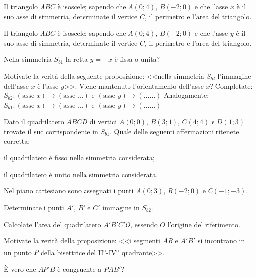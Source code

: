 \begin{esercizio}
  \label{ese:8.29} %
  Il triangolo \(ABC\) è isoscele; sapendo che \(A(0;4)\), \(B(-2;0)\) e che 
  l'asse \(x\) è il suo asse di simmetria, determinate il vertice \(C\), il 
  perimetro e l'area del triangolo.
\end{esercizio}

\begin{esercizio}
  \label{ese:8.30} %
  Il triangolo \(ABC\) è isoscele; sapendo che \(A(0;4)\), \(B(-2;0)\) e che 
  l'asse \(y\) è il suo asse di simmetria, determinate il vertice \(C\), il 
  perimetro e l'area del triangolo.
\end{esercizio}

\begin{esercizio}
  \label{ese:8.34} %
  Nella simmetria \(S_{b1}\) la retta \(y=-x\) è fissa o unita?
\end{esercizio}

\begin{esercizio}
  \label{ese:8.35} %
  Motivate la verità della seguente proposizione: <<nella simmetria 
  \(S_{b2}\) l'immagine dell'asse \(x\) è l'asse \(y\)>>. Viene mantenuto 
  l'orientamento dell'asse \(x\)?
  Completate: \(S_{b2}:(\text{asse }x)\rightarrow (\text{asse } 
  \ldots{})\) e \((\text{asse }y)\rightarrow(\ldots\ldots{})\)
  Analogamente: \(S_{b1}:(\text{asse }x)\rightarrow (\text{asse } 
  \ldots{})\) e \((\text{asse }y)\rightarrow(\ldots\ldots{})\)
\end{esercizio}

\begin{esercizio}
  \label{ese:8.36} %
  Dato il quadrilatero \(ABCD\) di vertici \(A(0;0)\), \(B(3;1)\), \(C(4;4)\) e 
  \(D(1;3)\) trovate il suo corrispondente in \(S_{b1}\). Quale delle 
  seguenti affermazioni ritenete corretta:
  \begin{enumeratea}
    \item il quadrilatero è fisso nella simmetria considerata;
    \item il quadrilatero è unito nella simmetria considerata.
  \end{enumeratea}
\end{esercizio}

\begin{esercizio}
  \label{ese:8.38} %
  Nel piano cartesiano sono assegnati i punti \(A(0;3)\), \(B(-2;0)\) e 
  \(C(-1;-3)\).
  \begin{enumeratea}
    \item Determinate i punti \(A'\), \(B'\) e \(C'\) immagine in \(S_{b2}\).
    \item Calcolate l'area del quadrilatero \(A'B'C'O\), essendo \(O\) 
    l'origine del riferimento.
    \item Motivate la verità della proposizione: <<i segmenti \(AB\) e 
    \(A'B'\) si incontrano in un punto \(P\) della bisettrice del 
    II\textsuperscript{o}-IV\textsuperscript{o} quadrante>>.
    \item \`E vero che \(AP'B\) è congruente a \(PAB'\)?
  \end{enumeratea}
\end{esercizio}

